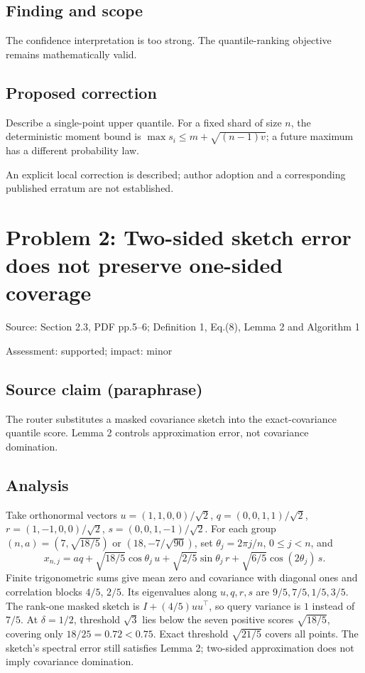\documentclass[11pt]{article}
\begin{document}
\subsection*{Finding and scope}

The confidence interpretation is too strong. The quantile-ranking objective remains mathematically valid.

\subsection*{Proposed correction}

Describe a single-point upper quantile. For a fixed shard of size \(n\), the deterministic moment bound is \(\max s_i\leq m+\sqrt{(n-1)v}\); a future maximum has a different probability law.

An explicit local correction is described; author adoption and a corresponding published erratum are not established.

\section*{Problem 2: Two-sided sketch error does not preserve one-sided coverage}

Source: Section 2.3, PDF pp.5–6; Definition 1, Eq.(8), Lemma 2 and Algorithm 1

Assessment: supported; impact: minor

\subsection*{Source claim (paraphrase)}

The router substitutes a masked covariance sketch into the exact-covariance quantile score. Lemma 2 controls approximation error, not covariance domination.

\subsection*{Analysis}

Take orthonormal vectors \(u=(1,1,0,0)/\sqrt2\), \(q=(0,0,1,1)/\sqrt2\), \(r=(1,-1,0,0)/\sqrt2\), \(s=(0,0,1,-1)/\sqrt2\). For each group \((n,a)=(7,\sqrt{18/5})\) or \((18,-7/\sqrt{90})\), set \(\theta_j=2\pi j/n\), \(0\leq j<n\), and \[x_{n,j}=a q+\sqrt{18/5}\cos\theta_j\,u+\sqrt{2/5}\sin\theta_j\,r+\sqrt{6/5}\cos(2\theta_j)\,s.\] Finite trigonometric sums give mean zero and covariance with diagonal ones and correlation blocks \(4/5\), \(2/5\). Its eigenvalues along \(u,q,r,s\) are \(9/5,7/5,1/5,3/5\). The rank-one masked sketch is \(I+(4/5)uu^\top\), so query variance is \(1\) instead of \(7/5\). At \(\delta=1/2\), threshold \(\sqrt3\) lies below the seven positive scores \(\sqrt{18/5}\), covering only \(18/25=0.72<0.75\). Exact threshold \(\sqrt{21/5}\) covers all points. The sketch’s spectral error still satisfies Lemma 2; two-sided approximation does not imply covariance domination.
\end{document}
